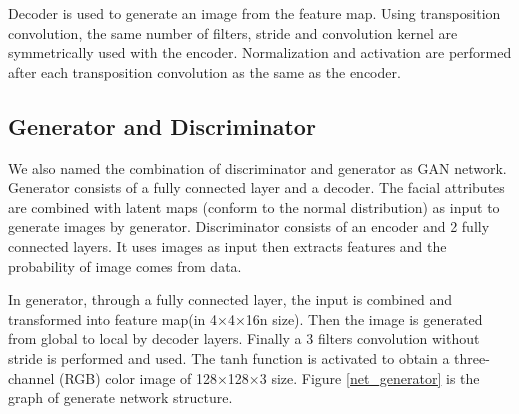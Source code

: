 Decoder is used to generate an image from the feature map.
Using transposition convolution, the same number of filters,
    stride and convolution kernel are symmetrically used with the encoder.
Normalization and activation are performed after each transposition convolution as the same as the encoder.

\subsection{Generator and Discriminator}

We also named the combination of discriminator and generator as GAN network.
Generator consists of a fully connected layer and a decoder.
The facial attributes are combined with latent maps (conform to the normal distribution) as input to generate images by generator.
Discriminator consists of an encoder and 2 fully connected layers.
It uses images as input then extracts features and the probability of image comes from data.


In generator, through a fully connected layer, the input is combined and transformed into feature map(in 4×4×16n size).
Then the image is generated from global to local by decoder layers.
Finally a 3 filters convolution without stride is performed and used.
The tanh function is activated to obtain a three-channel (RGB) color image of 128×128×3 size.
Figure \ref{net_generator} is the graph of generate network structure.

